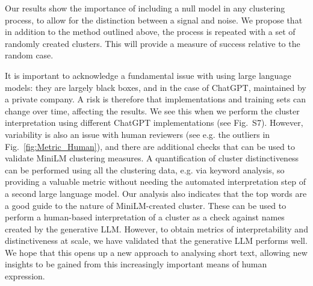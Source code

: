 \documentclass{article}
\begin{document}
Our results show the importance of including a null model in any clustering process, to allow for the distinction between a signal and noise.  We propose that in addition to the method outlined above, the process is repeated with a set of randomly created clusters.  This will provide a measure of success relative to the random case.



It is important to acknowledge a fundamental issue with using large language models: they are largely black boxes, and in the case of ChatGPT, maintained by a private company.  A risk is therefore that implementations and training sets can change over time, affecting the results.  We see this when we perform the cluster interpretation using different ChatGPT implementations (see Fig.~S7).  However, variability is also an issue with human reviewers (see e.g. the outliers in Fig.~\ref{fig:Metric_Human}), and there are additional checks that can be used to validate MiniLM clustering measures.  A quantification of cluster distinctiveness can be performed using all the clustering data, e.g. via keyword analysis, so providing a valuable metric without needing the automated interpretation step of a second large language model.  Our analysis also indicates that the top words are a good guide to the nature of MiniLM-created cluster.  These can be used to perform a human-based interpretation of a cluster as a check against names created by the generative LLM.  However, to obtain metrics of interpretability and distinctiveness at scale, we have validated that the generative LLM performs well.  We hope that this opens up a new approach to analysing short text, allowing new insights to be gained from this increasingly important means of human expression.




\end{document}
